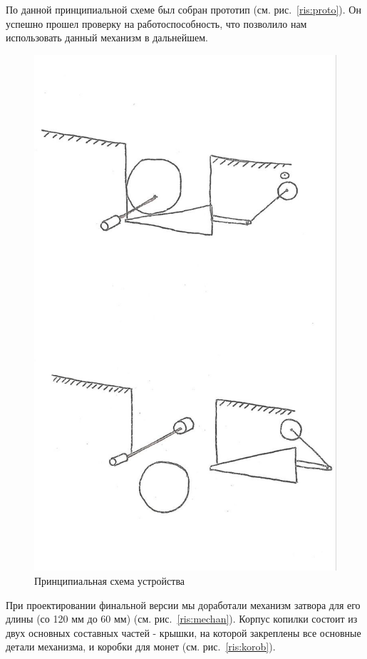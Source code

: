 По данной принципиальной схеме был собран прототип (см. рис.~\ref{ris:proto}). Он успешно прошел проверку на работоспособность, что позволило нам использовать данный механизм в дальнейшем.

\begin{figure}[H]
	\centering
	\includegraphics[width=12cm]{scheme_idea.jpg}
	\caption{Принципиальная схема устройства}
	\label{ris:scheme_idea}
\end{figure}
\par\medskip

При проектировании финальной версии мы доработали механизм затвора для его длины (со 120 мм до 60 мм) (см. рис.~\ref{ris:mechan}).
Корпус копилки состоит из двух основных составных частей - крышки, на которой закреплены все основные детали механизма, и коробки для монет (см. рис.~\ref{ris:korob}). 

